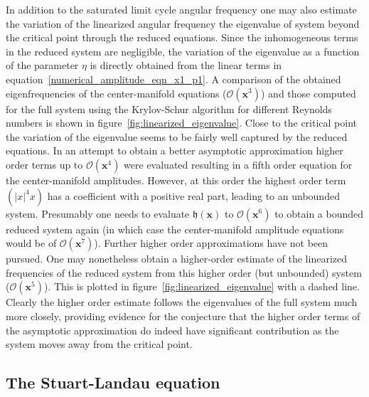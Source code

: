 In addition to the saturated limit cycle angular frequency one may also estimate the variation of the linearized angular frequency \ie the eigenvalue of system beyond the critical point through the reduced equations. Since the inhomogeneous terms in the reduced system are negligible, the variation of the eigenvalue as a function of the parameter $\eta$ is directly obtained from the linear terms  in equation~\eqref{numerical_amplitude_eqn_x1_p1}. A comparison of the obtained eigenfrequencies of the center-manifold equations ($\mathcal{O}(\mathbf{x}^{3})$) and those computed for the full system using the Krylov-Schur algorithm for different Reynolds numbers is shown in figure~\ref{fig:linearized_eigenvalue}. Close to the critical point the variation of the eigenvalue seems to be fairly well captured by the reduced equations. In an attempt to obtain a better asymptotic approximation higher order terms up to $\mathcal{O}(\mathbf{x}^{4})$ were evaluated resulting in a fifth order equation for the center-manifold amplitudes. However, at this order the highest order term $(|x|^{4}x)$ has a coefficient with a positive real part, leading to an unbounded system. Presumably one needs to evaluate $\mathfrak{h}(\mathbf{x})$ to $\mathcal{O}(\mathbf{x}^6)$ to obtain a bounded reduced system again (in which case the center-manifold amplitude equations would be of $\mathcal{O}(\mathbf{x}^{7})$). Further higher order approximations have not been pursued. One may nonetheless obtain a higher-order estimate of the linearized frequencies of the reduced system from this higher order (but unbounded) system ($\mathcal{O}(\mathbf{x}^{5})$). This is plotted in figure~\ref{fig:linearized_eigenvalue} with a dashed line. Clearly the higher order estimate follows the eigenvalues of the full system much more closely, providing evidence for the conjecture that the higher order terms of the asymptotic approximation do indeed have significant contribution as the system moves away from the critical point.

\subsection{The Stuart-Landau equation}
\label{stuart_landau}

